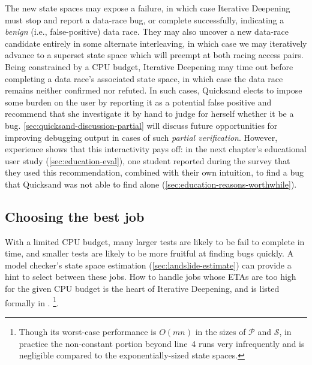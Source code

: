 The new state spaces may expose a failure, in which case Iterative Deepening must stop and report a data-race bug,
or complete successfully, indicating a {\em benign} (i.e., false-positive) data race.
They may also uncover a new data-race candidate entirely in some alternate interleaving,
in which case we may iteratively advance to a superset state space which will preempt at both racing access pairs.
Being constrained by a CPU budget,
Iterative Deepening may time out before completing a data race's associated state space,
in which case the data race remains neither confirmed nor refuted.
In such cases, Quicksand elects to impose some burden on the user
by reporting it as a potential false positive
and recommend that she investigate it by hand to judge for herself whether it be a bug.
\cref{sec:quicksand-discussion-partial} will discuss future opportunities for improving
debugging output in cases of such {\em partial verification}.
However, experience shows that this interactivity pays off:
in the next chapter's educational user study (\cref{sec:education-eval}),
one student reported during the survey that they used this recommendation,
combined with their own intuition,
to find a bug that Quicksand was not able to find alone (\cref{sec:education-reasons-worthwhile}).


\subsection{Choosing the best job}
\label{sec:quicksand-choosing}

With a limited CPU budget, many larger tests are likely to be fail to complete in time,
and smaller tests are likely to be more fruitful at finding bugs quickly.
A model checker's state space estimation (\cref{sec:landslide-estimate})
can provide a hint to select between these jobs.
How to handle jobs whose ETAs are too high for the given CPU budget
is the heart of Iterative Deepening,
and is listed formally in .%
\footnote{
Though its worst-case performance is $O(mn)$ in the
sizes of $\mathcal{P}$ and $\mathcal{S}$,
in practice the non-constant portion beyond line~4 runs very infrequently
and is negligible compared to the exponentially-sized state spaces.}.

